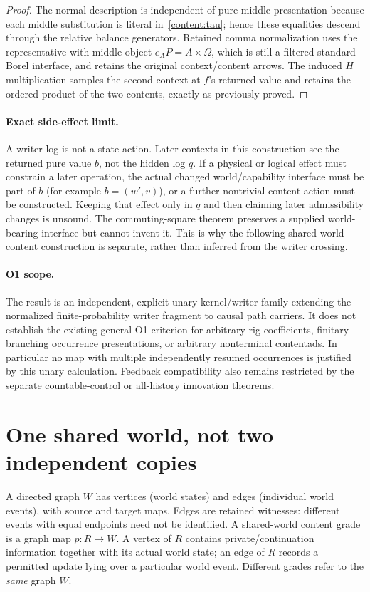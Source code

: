 \documentclass[11pt]{article}
\begin{document}
\begin{proof}
The normal description is independent of pure-middle presentation because each middle substitution is literal in~\eqref{content:tau}; hence these equalities descend through the relative balance generators. Retained comma normalization uses the representative with middle object $e_AP=A\times\Omega$, which is still a filtered standard Borel interface, and retains the original context/content arrows. The induced $H$ multiplication samples the second context at $f$'s returned value and retains the ordered product of the two contents, exactly as previously proved.
\end{proof}

\paragraph{Exact side-effect limit.} A writer log is not a state action. Later contexts in this construction see the returned pure value $b$, not the hidden log $q$. If a physical or logical effect must constrain a later operation, the actual changed world/capability interface must be part of $b$ (for example $b=(w',v)$), or a further nontrivial content action must be constructed. Keeping that effect only in $q$ and then claiming later admissibility changes is unsound. The commuting-square theorem preserves a supplied world-bearing interface but cannot invent it. This is why the following shared-world content construction is separate, rather than inferred from the writer crossing.

\paragraph{O1 scope.} The result is an independent, explicit unary kernel/writer family extending the normalized finite-probability writer fragment to causal path carriers. It does not establish the existing general O1 criterion for arbitrary rig coefficients, finitary branching occurrence presentations, or arbitrary nonterminal contentads. In particular no map with multiple independently resumed occurrences is justified by this unary calculation. Feedback compatibility also remains restricted by the separate countable-control or all-history innovation theorems.

\section{One shared world, not two independent copies}
A directed graph $W$ has vertices (world states) and edges (individual world events), with source and target maps. Edges are retained witnesses: different events with equal endpoints need not be identified. A shared-world content grade is a graph map $p:R\to W$. A vertex of $R$ contains private/continuation information together with its actual world state; an edge of $R$ records a permitted update lying over a particular world event. Different grades refer to the \emph{same} graph $W$.
\end{document}
